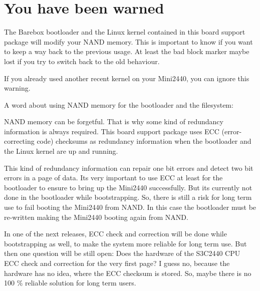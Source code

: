 %
%
%
%
%

\chapter{You have been warned}

The Barebox bootloader and the Linux kernel contained in this board support
package will modify your NAND memory. This is important to know if you want to
keep a way back to the previous usage. At least the bad block marker maybe
lost if you try to switch back to the old behaviour.

If you already used another recent kernel on your Mini2440, you can ignore this
warning.

A word about using NAND memory for the bootloader and the filesystem:

NAND memory can be forgetful. That is why some kind of redundancy information
is always required. This board support package uses ECC (error-correcting code)
checksums as redundancy information when the bootloader and the Linux kernel
are up and running.

This kind of redundancy information can repair one bit errors and detect two
bit errors in a page of data. Its very important to use ECC at least for the
bootloader to ensure to bring up the Mini2440 successfully. But its currently
not done in the bootloader while bootstrapping. So, there is still a risk for
long term use to fail booting the Mini2440 from NAND. In this case the
bootloader must be re-written making the Mini2440 booting again from NAND.

In one of the next releases, ECC check and correction will be done while
bootstrapping as well, to make the system more reliable for long term use.
But then one question will be still open: Does the hardware of the S3C2440 CPU
ECC check and correction for the very first page? I guess no, because the
hardware has no idea, where the ECC checksum is stored. So, maybe there is no
100 \% reliable solution for long term users.
